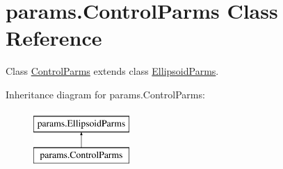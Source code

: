 \hypertarget{classparams_1_1_control_parms}{}\section{params.\+Control\+Parms Class Reference}
\label{classparams_1_1_control_parms}


Class \hyperlink{classparams_1_1_control_parms}{Control\+Parms} extends class \hyperlink{classparams_1_1_ellipsoid_parms}{Ellipsoid\+Parms}.  


Inheritance diagram for params.\+Control\+Parms\+:\begin{figure}[H]
\begin{center}
\leavevmode
\includegraphics[height=2.000000cm]{classparams_1_1_control_parms}
\end{center}
\end{figure}
